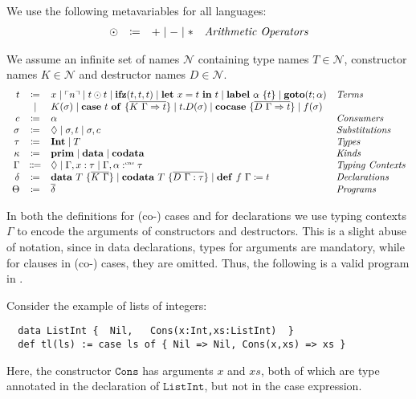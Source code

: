 \begin{definition}
  We use the following metavariables for all languages:
  \[
    \begin{array}{rcll}
      \odot  & \coloneqq & + \mid - \mid * & \emph{Arithmetic Operators}
    \end{array}
  \]
\end{definition}

\begin{definition}
  We assume an infinite set of names $\mathcal{N}$ containing type names $T\in\mathcal{N}$, constructor names $K\in\mathcal{N}$ and destructor names $D\in\mathcal{N}$.
  \[
    \begin{array}{r c l l}
      t & \coloneqq & x \mid \lit{n} \mid t \odot t \mid \ifz{t}{t}{t} \mid \letin{x}{t}{t} \mid \lab{\alpha}{t} \mid \goto{t}{\alpha}  & \emph{Terms}\\
      & \mid & K(\sigma) \mid \caseof{t}{\overline{K\ \Gamma \Rightarrow t}} \mid t.D(\sigma) \mid \cocase{\overline{D\ \Gamma \Rightarrow t}} \mid f(\sigma)& \\
      c & \coloneqq & \alpha & \emph{Consumers}\\
      \sigma & \coloneqq & \nil \mid \sigma,t \mid \sigma, c & \emph{Substitutions}\\
      \tau & \coloneqq & \tyint \mid T & \emph{Types} \\
      \kappa & \coloneq & \mathbf{prim}\mid\mathbf{data} \mid \mathbf{codata} & \emph{Kinds} \\
      \Gamma & \Coloneqq & \nil \mid \Gamma, x : \tau \mid \Gamma, \alpha \cnt \tau & \emph{Typing Contexts} \\
      \delta & \coloneqq & \mathbf{data}\ T\ \{ \overline{K\ \Gamma} \}  \mid \mathbf{codata}\ T\ \{ \overline{D\ \Gamma : \tau}\} \mid \defi{f\ \Gamma}{t} & \emph{Declarations}\\
      \Theta & \coloneqq & \overline{\delta} & \emph{Programs}\\
    \end{array}
  \]
\end{definition}
In both the definitions for (co-) cases and for declarations we use typing contexts $\Gamma$ to encode the arguments of constructors and destructors.
This is a slight abuse of notation, since in data declarations, types for arguments are mandatory, while for clauses in (co-) cases, they are omitted.
Thus, the following is a valid program in \surfacelang{}.
\begin{example}
  \label{ex:fun-syntax}
  Consider the example of lists of integers:
  \begin{lstlisting}
  data ListInt {  Nil,   Cons(x:Int,xs:ListInt)  }
  def tl(ls) := case ls of { Nil => Nil, Cons(x,xs) => xs }
  \end{lstlisting}
  Here, the constructor $\mathtt{Cons}$ has arguments $x$ and $xs$, both of which are type annotated in the declaration of $\mathtt{ListInt}$, but not in the case expression.
\end{example}

